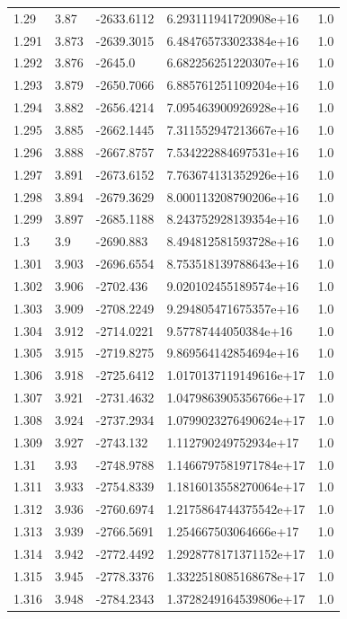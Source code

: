 \begin{tabular}{lllll}
1.29 & 3.87 & -2633.6112 & 6.293111941720908e+16 & 1.0 \\
1.291 & 3.873 & -2639.3015 & 6.484765733023384e+16 & 1.0 \\
1.292 & 3.876 & -2645.0 & 6.682256251220307e+16 & 1.0 \\
1.293 & 3.879 & -2650.7066 & 6.885761251109204e+16 & 1.0 \\
1.294 & 3.882 & -2656.4214 & 7.095463900926928e+16 & 1.0 \\
1.295 & 3.885 & -2662.1445 & 7.311552947213667e+16 & 1.0 \\
1.296 & 3.888 & -2667.8757 & 7.534222884697531e+16 & 1.0 \\
1.297 & 3.891 & -2673.6152 & 7.763674131352926e+16 & 1.0 \\
1.298 & 3.894 & -2679.3629 & 8.000113208790206e+16 & 1.0 \\
1.299 & 3.897 & -2685.1188 & 8.243752928139354e+16 & 1.0 \\
1.3 & 3.9 & -2690.883 & 8.494812581593728e+16 & 1.0 \\
1.301 & 3.903 & -2696.6554 & 8.753518139788643e+16 & 1.0 \\
1.302 & 3.906 & -2702.436 & 9.020102455189574e+16 & 1.0 \\
1.303 & 3.909 & -2708.2249 & 9.294805471675357e+16 & 1.0 \\
1.304 & 3.912 & -2714.0221 & 9.57787444050384e+16 & 1.0 \\
1.305 & 3.915 & -2719.8275 & 9.869564142854694e+16 & 1.0 \\
1.306 & 3.918 & -2725.6412 & 1.0170137119149616e+17 & 1.0 \\
1.307 & 3.921 & -2731.4632 & 1.0479863905356766e+17 & 1.0 \\
1.308 & 3.924 & -2737.2934 & 1.0799023276490624e+17 & 1.0 \\
1.309 & 3.927 & -2743.132 & 1.112790249752934e+17 & 1.0 \\
1.31 & 3.93 & -2748.9788 & 1.1466797581971784e+17 & 1.0 \\
1.311 & 3.933 & -2754.8339 & 1.1816013558270064e+17 & 1.0 \\
1.312 & 3.936 & -2760.6974 & 1.2175864744375542e+17 & 1.0 \\
1.313 & 3.939 & -2766.5691 & 1.254667503064666e+17 & 1.0 \\
1.314 & 3.942 & -2772.4492 & 1.2928778171371152e+17 & 1.0 \\
1.315 & 3.945 & -2778.3376 & 1.3322518085168678e+17 & 1.0 \\
1.316 & 3.948 & -2784.2343 & 1.3728249164539806e+17 & 1.0 \\

\end{tabular}
